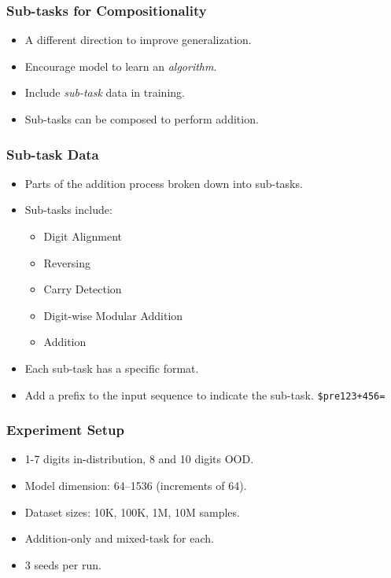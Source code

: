 \documentclass[14pt,aspectratio=169]{beamer}
\theoremstyle{remark}
\begin{document}
\begin{frame}
    \frametitle{Sub-tasks for Compositionality}
    \begin{itemize}
        \item A different direction to improve generalization.
        \item Encourage model to learn an \emph{algorithm}.
        \item Include \emph{sub-task} data in training.
        \item Sub-tasks can be composed to perform addition.
    \end{itemize}
\end{frame}

\begin{frame}
    \frametitle{Sub-task Data}
    \begin{itemize}
        \item Parts of the addition process broken down into sub-tasks.
        \item Sub-tasks include:
              \begin{itemize}
                  \item Digit Alignment
                  \item Reversing
                  \item Carry Detection
                  \item Digit-wise Modular Addition
                  \item Addition
              \end{itemize}
        \item Each sub-task has a specific format.
        \item Add a prefix to the input sequence to indicate the sub-task.
              \texttt{\$pre123+456=}
    \end{itemize}
\end{frame}

\begin{frame}
    \frametitle{Experiment Setup}
    \begin{itemize}
        \item 1-7 digits in-distribution, 8 and 10 digits OOD.
        \item Model dimension: 64--1536 (increments of 64).
        \item Dataset sizes: 10K, 100K, 1M, 10M samples.
        \item Addition-only and mixed-task for each.
        \item 3 seeds per run.
    \end{itemize}
\end{frame}
\end{document}
